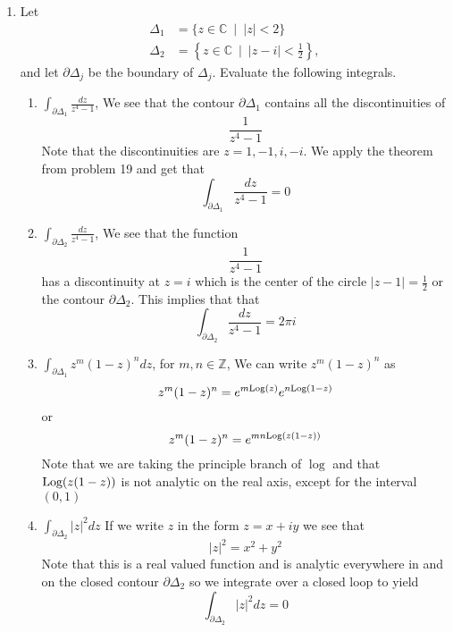 \documentclass[11pt]{article}
\newcommand{\CC}{\mathbb{C}}
\newcommand{\ZZ}{\mathbb{Z}}
\newcommand{\Log}{\textnormal{Log}}
\newcommand{\dd}{\displaystyle}
\begin{document}
\begin{enumerate}
\begin{enumerate}[(i)]
\begin{enumerate}[(a)]
\item\textit{the circle $|z-2i|=1$ traversed once anticlockwise.}
For
$$\int_C \frac{z+i}{z^2(z+2)}dz$$
where $C$ is the circle $|z-2i|=i$ we pick $f(z)$ as
$$f(z) = \frac{z+i}{z+2}$$
Again \emph{Theorem 9} applys where $n=1$ and $z=0$ so we calculate
\begin{align*}
f'(z) &= \frac{d}{dz}\frac{z+i}{z+2}\\
&= \frac{1}{z+2}+\frac{-z+i}{(z+2)^{2}}\\
f'(0) &= \frac{2+i}{4}
\end{align*}
(See part (a) for rigorous calculation of the derivative). So if we solve for the integral we get
\begin{align*}
\int_C \frac{z+i}{z^2(z+2)}dz &= \frac{2+i}{4}2\pi i\\
&= \frac{2i-1}{2}\pi
\end{align*}
\end{enumerate}

\end{enumerate}
\item Let 
\begin{align*}
\Delta_1 &= \{z\in \CC\ \mid\ |z|< 2\}\\
\Delta_2 &= \left\{z\in \CC\ \mid\ |z-i|<\frac{1}{2}\right\},
\end{align*}
and let $\partial\Delta_j$ be the boundary of $\Delta_j$.  Evaluate the following integrals.
\begin{enumerate}
\item $\dd\int_{\partial\Delta_1}\frac{dz}{z^4-1}$,
We see that the contour $\partial\Delta_1$ contains all the discontinuities of 
$$\frac{1}{z^4-1}$$
Note that the discontinuities are $z=1,-1,i,-i$. We apply the theorem from problem 19 and get that
$$\int_{\partial\Delta_1}\frac{dz}{z^4-1}=0$$

\item $\dd\int_{\partial\Delta_2}\frac{dz}{z^4-1}$,
We see that the function 
$$\frac{1}{z^4-1}$$
has a discontinuity at $z=i$ which is the center of the circle $|z-1|=\frac{1}{2}$ or the contour $\partial\Delta_2$. This implies that that
$$\int_{\partial\Delta_2}\frac{dz}{z^4-1} = 2\pi i$$

\item $\dd\int_{\partial\Delta_1}z^m(1-z)^n dz$, for $m,n\in\ZZ$,
We can write $z^m(1-z)^n$ as
$$z^m(1-z)^n = e^{m\Log(z)}e^{n\Log(1-z)}$$
or
$$z^m(1-z)^n = e^{mn\Log (z(1-z))}$$
Note that we are taking the principle branch of $\log$ and that $\Log(z(1-z))$ is not analytic on the real axis, except for the interval $(0,1)$

\item $\dd\int_{\partial\Delta_2}|z|^2dz$
If we write $z$ in the form $z=x+iy$ we see that 
$$|z|^2 = x^2+y^2$$
Note that this is a real valued function and is analytic everywhere in and on the closed contour $\partial\Delta_2$ so we integrate over a closed loop to yield
$$\int_{\partial\Delta_2}|z|^2dz=0$$

\end{enumerate}
\end{enumerate}
\end{document}
